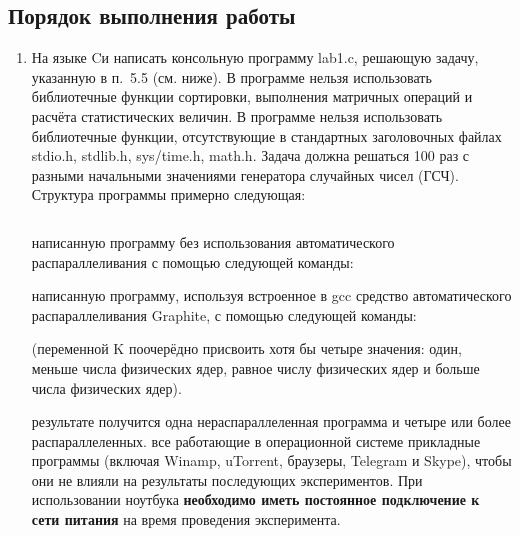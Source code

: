 \subsection{Порядок выполнения работы}
\begin{enumerate}
     компьютере с многоядерным процессором установить Unix-подобную операционную систему и компилятор GCC версии не ниже 9.x. При невозможности установить Unix-подобную операционную систему или отсутствии компьютера с многоядерным процессором можно выполнять лабораторную работу на виртуальной машине. Минимальное число ядер при использовании виртуальной машины -- два. Важным условием является отключение гипертрединга, для того, чтобы выполнить честные замеры времени. 
    
    \item На языке Cи написать консольную программу lab1.c, решающую задачу, указанную в п.~5.5 (см. ниже). В программе нельзя использовать библиотечные функции сортировки, выполнения матричных операций и расчёта статистических величин. В программе нельзя использовать библиотечные функции, отсутствующие в стандартных заголовочных файлах stdio.h, stdlib.h, sys/time.h, math.h. Задача должна решаться 100 раз с разными начальными значениями генератора случайных чисел (ГСЧ). Структура программы примерно следующая:

    \inputminted[fontsize=\footnotesize]{c++}{listings/lab1Example.cpp}

     написанную программу без использования автоматического распараллеливания с помощью следующей команды: 
    
    
     написанную программу, используя встроенное в gcc средство автоматического распараллеливания Graphite, с помощью следующей команды:
    
    
    \noindent(переменной K поочерёдно присвоить хотя бы четыре значения: один, меньше числа физических ядер, равное числу физических ядер и больше числа физических ядер).
    
     результате получится одна нераспараллеленная программа и четыре или более распараллеленных.
     все работающие в операционной системе прикладные программы (включая Winamp, uTorrent, браузеры, Telegram и Skype), чтобы они не влияли на результаты последующих экспериментов. При использовании ноутбука \textbf{необходимо иметь постоянное подключение к сети питания} на время проведения эксперимента.
    

\end{enumerate}

